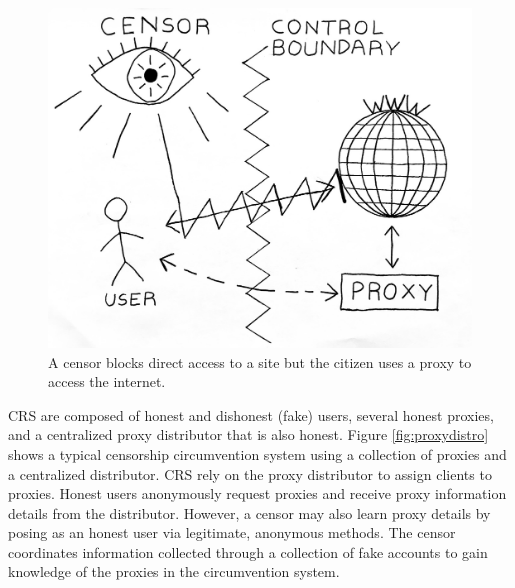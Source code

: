 \begin{figure}[h!]
\centering
     \includegraphics[width=1.0\textwidth]{fig/censor_block_new.png}
    \caption{A censor blocks direct access to a site but the citizen uses a proxy to access the internet.}
    
    \label{fig:censorblock}
\end{figure}

\ac{CRS} are composed of honest and dishonest (fake) users, several honest proxies, and a centralized proxy distributor that is also honest. Figure \ref{fig:proxydistro} shows a typical censorship circumvention system using a collection of proxies and a centralized distributor. \ac{CRS} rely on the proxy distributor to assign clients to proxies. Honest users anonymously request proxies and receive proxy information details from the distributor. However, a censor may also learn proxy details by posing as an honest user via legitimate, anonymous methods. The censor coordinates information collected through a collection of fake accounts to gain knowledge of the proxies in the circumvention system.

